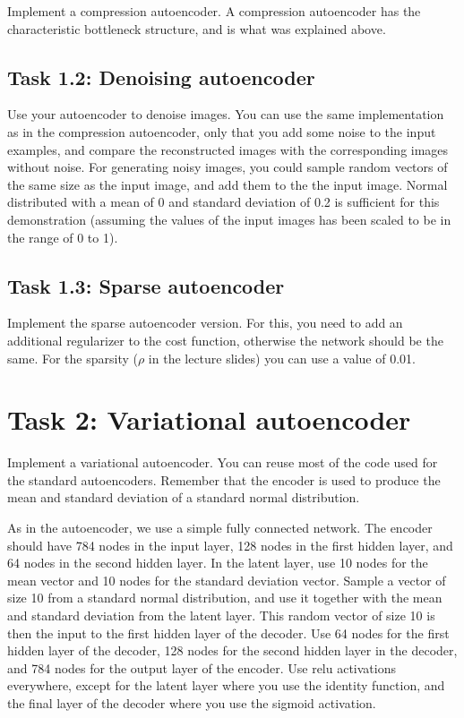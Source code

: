 \documentclass[paper=a4, fontsize=11pt]{article} %
\numberwithin{equation}{section} %
\numberwithin{figure}{section} %
\numberwithin{table}{section} %
\begin{document}
\noindent Implement a compression autoencoder. A compression autoencoder has the characteristic bottleneck
structure, and is what was explained above.

\subsection*{Task 1.2: Denoising autoencoder}

\noindent Use your autoencoder to denoise images. You can use the same implementation as in the compression
autoencoder, only that you add some noise to the input examples, and compare the reconstructed
images with the corresponding images without noise. For generating noisy images, you could sample
random vectors of the same size as the input image, and add them to the the input image. Normal
distributed with a mean of 0 and standard deviation of 0.2 is sufficient for this demonstration
(assuming the values of the input images has been scaled to be in the range of 0 to 1).

\subsection*{Task 1.3: Sparse autoencoder}

\noindent Implement the sparse autoencoder version. For this, you need to add an additional regularizer to
the cost function, otherwise the network should be the same. For the sparsity ($\rho$ in the
lecture slides) you can use a value of 0.01.

\section*{Task 2: Variational autoencoder}

\noindent Implement a variational autoencoder. You can reuse most of the code used for the standard
autoencoders. Remember that the encoder is used to produce the mean and standard deviation of a
standard normal distribution.

As in the autoencoder, we use a simple fully connected network. The encoder should have 784 nodes
in the input layer, 128 nodes in the first hidden layer, and 64 nodes in the second hidden layer.
In the latent layer, use 10 nodes for the mean vector and 10 nodes for the standard deviation
vector. Sample a vector of size 10 from a standard normal distribution, and use it together with
the mean and standard deviation from the latent layer. This random vector of size 10 is then the
input to the first hidden layer of the decoder. Use 64 nodes for the first hidden layer of the
decoder, 128 nodes for the second hidden layer in the decoder, and 784 nodes for the output layer
of the encoder. Use relu activations everywhere, except for the latent layer where you use the
identity function, and the final layer of the decoder where you use the sigmoid activation.
\end{document}
